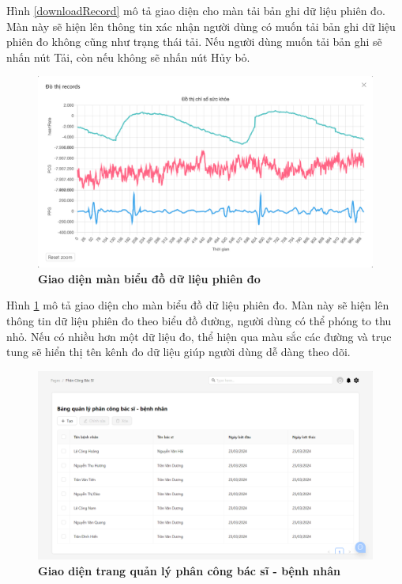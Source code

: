 Hình \ref{downloadRecord} mô tả giao diện cho màn tải bản ghi dữ liệu phiên đo. Màn này sẽ hiện lên thông tin xác nhận người dùng có muốn 
tải bản ghi dữ liệu phiên đo không cũng như trạng thái tải. Nếu người dùng muốn tải bản ghi sẽ nhấn nút Tải, còn nếu không sẽ nhấn nút Hủy bỏ.

\begin{figure}[H]
  \centering
  \includegraphics[scale=0.6]{Images/server/webUI/chart.png}
  \caption[Giao diện màn biểu đồ dữ liệu phiên đo]{\bfseries \fontsize{12pt}{0pt}\selectfont Giao diện màn biểu đồ dữ liệu phiên đo}
  \label{recordChart} %
\end{figure}

Hình \ref{recordChart} mô tả giao diện cho màn biểu đồ dữ liệu phiên đo. Màn này sẽ hiện lên thông tin dữ liệu phiên đo theo biểu đồ đường, người dùng 
có thể phóng to thu nhỏ. Nếu có nhiều hơn một dữ liệu đo, thể hiện qua màu sắc các đường và trục tung sẽ hiển thị tên kênh đo dữ liệu giúp người dùng dễ dàng theo dõi.

\begin{figure}[H]
  \centering
  \includegraphics[scale=0.5]{Images/server/webUI/pdaTable.png}
  \caption[Giao diện trang quản lý phân công bác sĩ - bệnh nhân]{\bfseries \fontsize{12pt}{0pt}\selectfont Giao diện trang quản lý phân công bác sĩ - bệnh nhân}
  \label{pdaTable} %
\end{figure}

